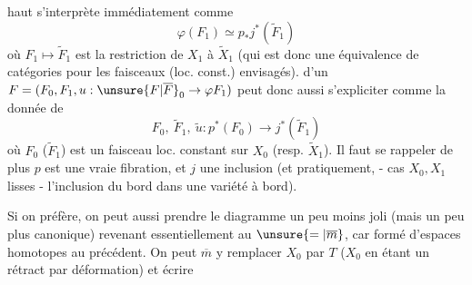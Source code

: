 haut s'interprète immédiatement comme
\[
\varphi(F_1)\simeq p_*j^*(\widetilde F_1)
\]
où $F_1\mapsto\widetilde F_1$ est la restriction de $X_1$ à $\widetilde X_1$ (qui est donc une équivalence de catégories pour les faisceaux (loc. const.) envisagés).   d'un $F=(F_0,F_1,u:\unsure{F|\overline F}_0\to\varphi F_1)$ peut donc aussi s'expliciter comme la donnée de
\[
F_0,\ \widetilde F_1,\ \widetilde u:p^*(F_0)\longrightarrow j^*(\widetilde F_1)
\]
où $F_0$ ($\widetilde F_1$) est un faisceau loc. constant sur $X_0$ (resp. $\widetilde X_1$). Il faut se rappeler de plus  $p$ est une vraie fibration, et $j$ une inclusion (et pratiquement, - cas $X_0,X_1$ lisses -  l'inclusion du bord dans une variété à bord).

Si on préfère, on peut aussi prendre le diagramme un peu moins joli (mais un peu plus canonique)
revenant essentiellement au $\unsure{=|\overline m}$, car formé d'espaces homotopes au précédent. On peut $\overline m$ y remplacer $X_0$ par $T$ ($X_0$ en étant un rétract par déformation) et écrire
